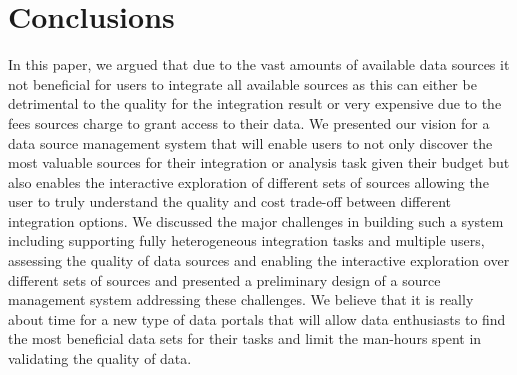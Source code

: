 \documentclass{sig-alternate}
\begin{document}
\section{Conclusions}
\label{sec:conclusion}
In this paper, we argued that due to the vast amounts of available data sources it not beneficial for users to integrate all available sources as this can either be detrimental to the quality for the integration result or very expensive due to the fees sources charge to grant access to their data. We presented our vision for a data source management system that will enable users to not only discover the most valuable sources for their integration or analysis task given their budget but also enables the interactive exploration of different sets of sources allowing the user to truly understand the quality and cost trade-off between different integration options. We discussed the major challenges in building such a system including supporting fully heterogeneous integration tasks and multiple users, assessing the quality of data sources and enabling the interactive exploration over different sets of sources and presented a preliminary design of a source management system addressing these challenges. We believe that it is really about time for a new type of data portals that will allow data enthusiasts to find the most beneficial data sets for their tasks and limit the man-hours spent in validating the quality of data. 



\end{document}
